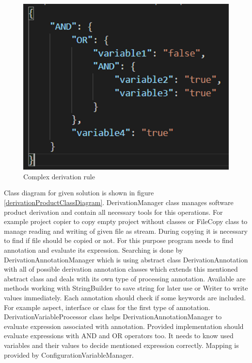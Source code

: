 \documentclass[11pt,english,a4paper,twoside]{article}
\begin{document}
\begin{figure}[H]  %
					\begin{center}
									\includegraphics[width=0.65\linewidth]{fig/expresion.png}
									\caption{Complex derivation rule}
									\label{complexDerivationRule}
					\end{center}
\end{figure}


Class diagram for given solution is shown in figure \ref{derivationProductClassDiagram}. DerivationManager class manages software product derivation and contain all necessary tools for this operations. For example project copier to copy empty project without classes or FileCopy class to manage reading and writing of given file as stream. During copying it is necessary to find if file should be copied or not. For this purpose program needs to find annotation and evaluate its expression. Searching is done by DerivationAnnotationManager which is using abstract class DerivationAnnotation with all of possible derivation annotation classes which extends this mentioned abstract class and deals with its own type of processing annotation. Available are methods working with StringBuilder to save string for later use or Writer to write values immediately. Each annotation should check if some keywords are included. For example aspect, interface or class for the first type of annotation. DerivationVariableProcessor class helps DerivationAnnotationManager to evaluate expression associated with annotation. Provided implementation should evaluate expressions with AND and OR operators too. It needs to know used variables and their values to decide mentioned expression correctly. Mapping is provided by ConfigurationVariableManager.
\end{document}
